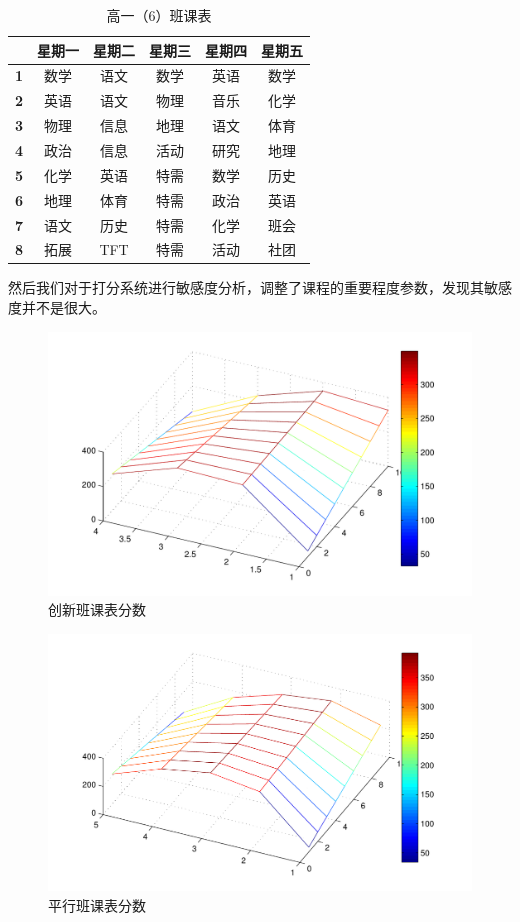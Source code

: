 \documentclass[a4paper]{article}
\begin{document}
 \begin{table}[H]
 \centering
 \begin{tabular}{cccccc}
 \toprule
 & \bf 星期一 & \bf 星期二 & \bf 星期三 & \bf 星期四 & \bf 星期五 \\
 \midrule
 \bf 1 & 数学 & 语文 & 数学 & 英语 & 数学 \\
 \bf 2 & 英语 & 语文 & 物理 & 音乐 & 化学 \\
 \bf 3 & 物理 & 信息 & 地理 & 语文 & 体育 \\
 \bf 4 & 政治 & 信息 & 活动 & 研究 & 地理 \\
 \midrule
 \bf 5 & 化学 & 英语 & 特需 & 数学 & 历史 \\
 \bf 6 & 地理 & 体育 & 特需 & 政治 & 英语 \\
 \bf 7 & 语文 & 历史 & 特需 & 化学 & 班会 \\
 \bf 8 & 拓展 & TFT  & 特需 & 活动 & 社团 \\
 \bottomrule
 \end{tabular}
 \caption{高一（6）班课表}
 \end{table}

 \clearpage

 然后我们对于打分系统进行敏感度分析，调整了课程的重要程度参数，发现其敏感度并不是很大。

 \begin{figure}[H]
 \centerline{\includegraphics[scale=0.7]{innoscore.pdf}}
 \caption{创新班课表分数}
 \end{figure}

 \begin{figure}[H]
 \centerline{\includegraphics[scale=0.7]{normscore.pdf}}
 \caption{平行班课表分数}
 \end{figure}
\end{document}
